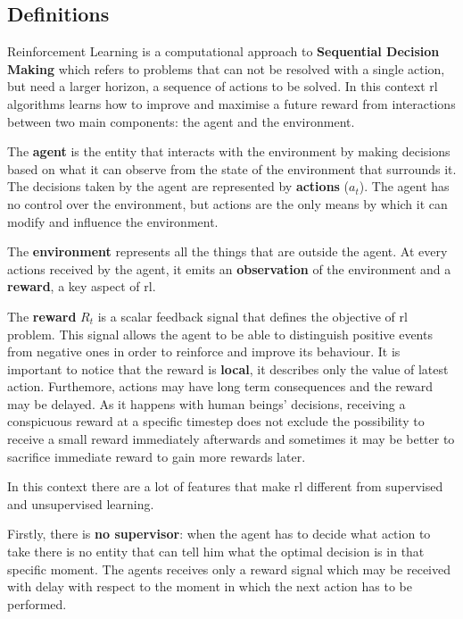 \subsection{Definitions}

Reinforcement Learning is a computational approach to \textbf{Sequential Decision Making} which refers to problems that can not be resolved with a single action, but need a larger horizon, a sequence of actions to be solved. In this context \gls{rl} algorithms learns how to improve and maximise a future reward from interactions between two main components: the agent and the environment. 

The \textbf{agent} is the entity that interacts with the environment by making decisions based on what it can observe from the state of the environment that surrounds it. The decisions taken by the agent are represented by \textbf{actions} ($a_t$). The agent has no control over the environment, but actions are the only means by which it can modify and influence the environment.

The \textbf{environment} represents all the things that are outside the agent. At every actions received by the agent, it emits an \textbf{observation} of the environment and a \textbf{reward}, a key aspect of \gls{rl}.

The \textbf{reward} $R_t$ is a scalar feedback signal that defines the objective of \gls{rl} problem. This signal allows the agent to be able to distinguish positive events from negative ones in order to reinforce and improve its behaviour. It is important to notice that the reward is \textbf{local}, it describes only the value of latest action. Furthemore, actions may have long term consequences and the reward may be delayed. As it happens with human beings' decisions, receiving a conspicuous reward at a specific timestep does not exclude the possibility to receive a small reward immediately afterwards and sometimes it may be better to sacrifice immediate reward to gain more rewards later.


In this context there are a lot of features that make \gls{rl} different from supervised and unsupervised learning.

Firstly, there is \textbf{no supervisor}: when the agent has to decide what action to take there is no entity that can tell him what the optimal decision is in that specific moment. The agents receives only a reward signal which may be received with delay with respect to the moment in which the next action has to be performed.

